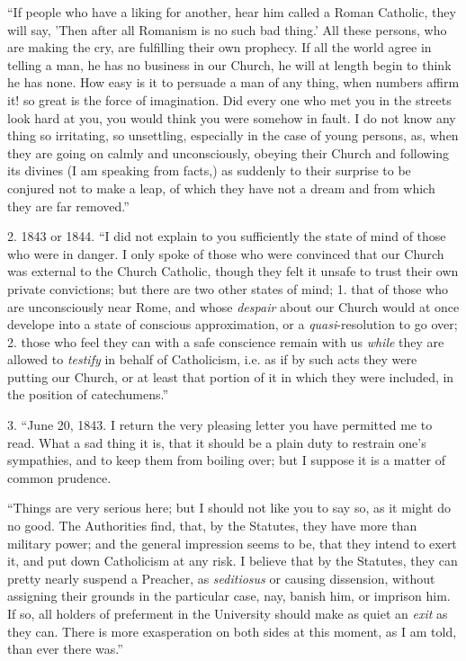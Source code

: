 ``If people who have a liking for another, hear him called a
Roman Catholic, they will say, 'Then after all Romanism is no such bad
thing.' All these persons, who are making the cry, are fulfilling their
own prophecy. If all the world agree in telling a man, he has no
business in our Church, he will at length begin to think he has none.
How easy is it to persuade a man of any thing, when numbers affirm it!
so great is the force of imagination. Did every one who met you in the
streets look hard at you, you would think you were somehow in fault. I
do not know any thing so irritating, so unsettling, especially in the
case of young persons, as, when they are going on calmly and
unconsciously, obeying their Church and following its divines (I am
speaking from facts,) as suddenly to their surprise to be conjured not
to make a leap, of which they have not a dream and from which they are
far removed.''

2. 1843 or 1844. ``I did not explain to you
sufficiently the state of mind of those who were in danger. I only spoke
of those who were convinced that our Church was external to the Church
Catholic, though they felt it unsafe to trust their own private
convictions; but there are two other states of mind; 1. that of those
who are unconsciously near Rome, and whose \emph{despair} about our
Church would at once develope into a state of conscious
approximation, or a \emph{quasi}-resolution to go over; 2. those who
feel they can with a safe conscience remain with us \emph{while} they are
allowed to \emph{testify} in behalf of Catholicism, i.e. as if by such
acts they were putting our Church, or at least that portion of it in
which they were included, in the position of catechumens.''

3. ``June 20, 1843. I return the very pleasing letter you
have permitted me to read. What a sad thing it is, that it should be a
plain duty to restrain one's sympathies, and to keep them from boiling
over; but I suppose it is a matter of common prudence.

``Things are very serious here; but I should not like you to
say so, as it might do no good. The Authorities find, that, by the
Statutes, they have more than military power; and the general impression
seems to be, that they intend to exert it, and put down Catholicism at
any risk. I believe that by the Statutes, they can pretty nearly suspend
a Preacher, as \emph{seditiosus} or causing dissension, without
assigning their grounds in the particular case, nay, banish him, or
imprison him. If so, all holders of preferment in the University should
make as quiet an \emph{exit} as they can. There is more exasperation on
both sides at this moment, as I am told, than ever there was.''

